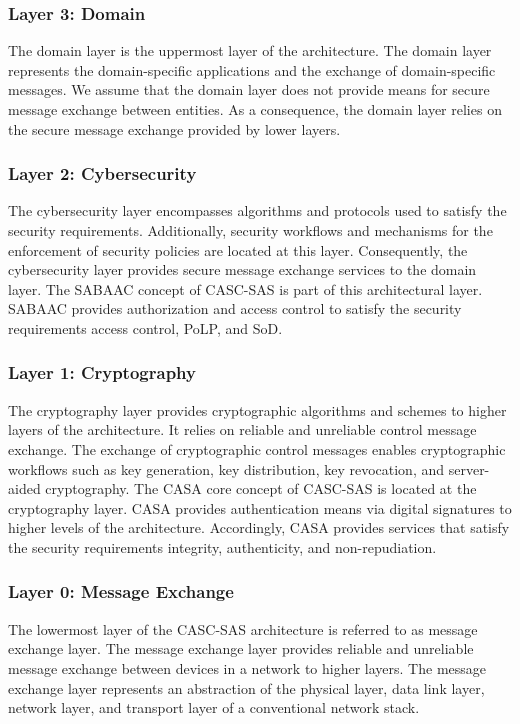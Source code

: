 \subsubsection{Layer 3: Domain}
The domain layer is the uppermost layer of the architecture.
The domain layer represents the domain-specific applications and the exchange of domain-specific messages.
We assume that the domain layer does not provide means for secure message exchange between entities.
As a consequence, the domain layer relies on the secure message exchange provided by lower layers.

\subsubsection{Layer 2: Cybersecurity}
The cybersecurity layer encompasses algorithms and protocols used to satisfy the security requirements.
Additionally, security workflows and mechanisms for the enforcement of security policies are located at this layer.
Consequently, the cybersecurity layer provides secure message exchange services to the domain layer.
The SABAAC concept of CASC-SAS is part of this architectural layer.
SABAAC provides authorization and access control to satisfy the security requirements access control, PoLP, and SoD.

\subsubsection{Layer 1: Cryptography}
The cryptography layer provides cryptographic algorithms and schemes to higher layers of the architecture.
It relies on reliable and unreliable control message exchange.
The exchange of cryptographic control messages enables cryptographic workflows such as key generation, key distribution, key revocation, and server-aided cryptography.
The CASA core concept of CASC-SAS is located at the cryptography layer.
CASA provides authentication means via digital signatures to higher levels of the architecture.
Accordingly, CASA provides services that satisfy the security requirements integrity, authenticity, and non-repudiation.

\subsubsection{Layer 0: Message Exchange}
The lowermost layer of the CASC-SAS architecture is referred to as message exchange layer.
The message exchange layer provides reliable and unreliable message exchange between devices in a network to higher layers.
The message exchange layer represents an abstraction of the physical layer, data link layer, network layer, and transport layer of a conventional network stack.

